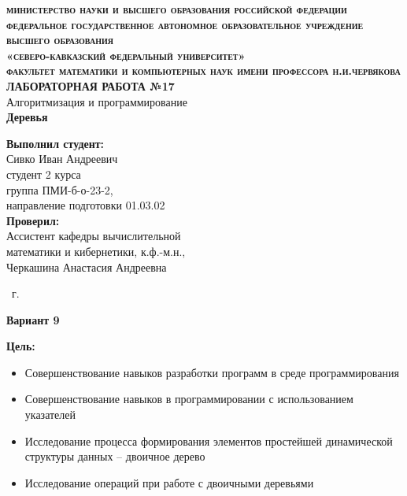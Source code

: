 \documentclass[a4paper,12pt]{article}
\begin{document}
\begin{titlepage}
  \begin{center}
    {\large\scshape\bfseries
    министерство науки и высшего образования российской федерации\\
    федеральное государственное автономное образовательное учреждение высшего образования\\
    «северо-кавказский федеральный университет»\\
    факультет математики и компьютерных наук имени профессора н.и.червякова}
    \vfill
    \Large{\textbf{ЛАБОРАТОРНАЯ РАБОТА №17}}\\[2mm]
    \large{Алгоритмизация и программирование}\\[6mm]
    \large{\textbf{Деревья}}\\[20mm]
  \end{center}
  \begin{flushright}
    \textbf{Выполнил студент:}\\
    Сивко Иван Андреевич\\
    студент 2 курса\\
    группа ПМИ-б-о-23-2,\\
    направление подготовки 01.03.02\\[5mm]
    \textbf{Проверил:}\\
    Ассистент кафедры вычислительной\\
    математики и кибернетики, к.ф.-м.н.,\\
    Черкашина Анастасия Андреевна
  \end{flushright}
  \vfill
  \centerline{ \the\year\ г. }
\end{titlepage}


\centerline{\large\textbf{Вариант 9}}
\textbf{Цель:}
\begin{small}
  \begin{itemize}
    \item Совершенствование навыков разработки программ в среде программирования
    \item Совершенствование навыков в программировании с использованием указателей
    \item Исследование процесса формирования элементов простейшей динамической структуры данных – двоичное дерево
    \item Исследование операций при работе с двоичными деревьями
  \end{itemize}
\end{small}
\end{document}
